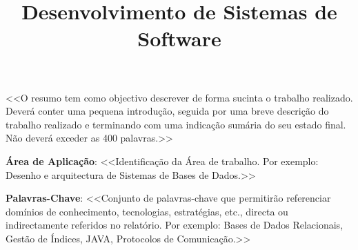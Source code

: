 \documentclass[a4paper,12pt]{scrreprt}
\title {Desenvolvimento de Sistemas de Software}
\author{\authorthing}
\date{}
\begin{document}

\makecover




\renewenvironment{abstract}
 {\par\noindent\textbf{\Large\abstractname}\par\bigskip}
 {}

\begin{flushleft}
\begin{abstract}
    <<O resumo tem como objectivo descrever de forma sucinta o trabalho realizado. Deverá conter uma pequena introdução, seguida por uma breve descrição do trabalho realizado e terminando com uma indicação sumária do seu estado final. Não deverá exceder as 400 palavras.>> 
    \par \textbf{Área de Aplicação}: <<Identificação da Área de trabalho. Por exemplo: Desenho e arquitectura de Sistemas de Bases de Dados.>> 
    \par \textbf{Palavras-Chave}: <<Conjunto de palavras-chave que permitirão referenciar domínios de conhecimento, tecnologias, estratégias, etc., directa ou indirectamente referidos no relatório. Por exemplo: Bases de Dados Relacionais, Gestão de Índices, JAVA, Protocolos de Comunicação.>>
\end{abstract}
\end{flushleft}


\pagebreak



\renewcommand{\contentsname}{Índice}

\tableofcontents

\pagebreak

\listoffigures

\pagebreak
\end{document}
